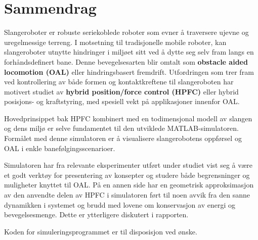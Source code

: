 \chapter{Sammendrag}




Slangeroboter er robuste seriekoblede roboter som evner å traversere ujevne og uregelmessige terreng. I motsetning til tradisjonelle mobile roboter, kan slangeroboter utnytte hindringer i miljøet sitt ved å dytte seg selv fram langs en forhåndsdefinert bane. Denne bevegelsesarten blir omtalt som \textbf{obstacle aided locomotion (OAL)} eller hindringsbasert fremdrift. Utfordringen som trer fram ved kontrollering av både formen og kontaktkreftene til slangeroboten har motivert studiet av  \textbf{hybrid position/force control (HPFC)} eller hybrid posisjons- og kraftstyring, med spesiell vekt på applikasjoner innenfor OAL.

Hovedprinsippet bak HPFC kombinert med en todimensjonal modell av slangen og dens miljø er selve fundamentet til den utviklede MATLAB-simulatoren. Formålet med denne simulatoren er å visualisere slangerobotens oppførsel og OAL i enkle banefølgingsscenarioer.

Simulatoren har fra relevante eksperimenter utført under studiet vist seg å være et godt verktøy for presentering av konsepter og studere både begrensninger og muligheter knyttet til OAL. På en annen side har en geometrisk approksimasjon av den anvendte delen av HPFC i simulatoren ført til noen avvik fra den sanne dynamikken i systemet og brudd med lovene om konservasjon av energi og bevegelsesmenge. Dette er ytterligere diskutert i rapporten.

Koden for simuleringsprogrammet er til disposisjon ved ønske.

\makeatletter
{}


\makeatother







